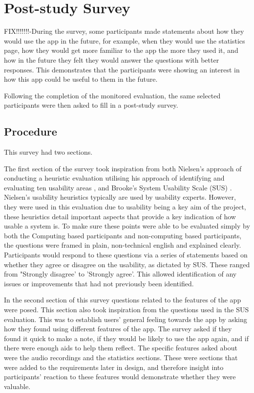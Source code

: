 \documentclass{l4proj}
\begin{document}
\section{Post-study Survey}
FIX!!!!!!!-During the survey, some participants made statements about how they would use the app in the future, for example, when they would use the statistics page, how they would get more familiar to the app the more they used it, and how in the future they felt they would answer the questions with better responses. This demonstrates that the participants were showing an interest in how this app could be useful to them in the future.

Following the completion of the monitored evaluation, the same selected participants were then asked to fill in a post-study survey. 

\subsection{Procedure}

This survey had two sections.

The first section of the survey took inspiration from both Nielsen’s approach of conducting a heuristic evaluation utilising his approach of identifying and evaluating ten usability areas \citep{Nielsen10}, and Brooke's System Usability Scale (SUS) \citep{affairs_system_2013}. Nielsen's usability heuristics typically are used by usability experts. However, they were used in this evaluation due to usability being a key aim of the project, these heuristics detail important aspects that provide a key indication of how usable a system is. To make sure these points were able to be evaluated simply by both the Computing based participants and non-computing based participants, the questions were framed in plain, non-technical english and explained clearly. Participants would respond to these questions via a series of statements based on whether they agree or disagree on the usability, as dictated by SUS. These ranged from "Strongly disagree' to 'Strongly agree'. This allowed identification of any issues or improvements that had not previously been identified. 

In the second section of this survey questions related to the features of the app were posed. This section also took inspiration from the questions used in the SUS evaluation. This was to establish users' general feeling towards the app by asking how they found using different features of the app. The survey asked if they found it quick to make a note, if they would be likely to use the app again, and if there were enough aids to help them reflect. The specific features asked about were the audio recordings and the statistics sections. These were sections that were added to the requirements later in design, and therefore insight into participants' reaction to these features would demonstrate whether they were valuable. 
\end{document}
